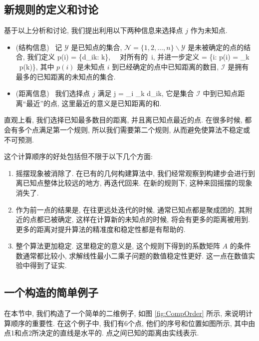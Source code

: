 \documentclass{CASthesis_zzk}
\begin{document}
\subsection{新规则的定义和讨论}
基于以上分析和讨论, 我们提出利用以下两种信息来选择点 $j$ 作为未知点.
\begin{itemize}
  \item (结构信息)%
  ~记 $\mathcal{Y}$ 是已知点的集合, $\mathcal{N} = \{1,2,\ldots,n\}\backslash \mathcal{Y}$ 是未被确定的点的结合, 我们定义
  \be p(i) = \sharp \{d_{ik}: k\in {}\}, ~~对所有的~i\in {}, \label{rule1} \ee
  并进一步定义
  \be {} = \{i: p(i) = \max_{k\in {}} ~p(k)\}, \label{rule2}\ee
  其中 $p(i)$ 是未知点 $i$ 到已经确定的点中已知距离的数目, $\mathcal{I}$ 是拥有最多的已知距离的未知点的集合.
  \item (距离信息)%
  ~我们选择点 $j$ 满足
  \be j = \arg\min_{i\in {}} \sum_{k\in {}} d_{ik}, \label{rule3}\ee
  它是集合 $\mathcal{I}$ 中到已知点距离``最近''的点, 这里最近的意义是已知距离的和.
\end{itemize}

直观上看, 我们选择已知最多数目的距离, 并且离已知点最近的点.
在很多时候, 都会有多个点满足第一个规则, 所以我们需要第二个规则,
从而避免使算法不稳定或不可预测.

这个计算顺序的好处包括但不限于以下几个方面:
\begin{enumerate}
  \item 摇摆现象被消除了. 在已有的几何构建算法中, 我们经常观察到构建步会进行到离已知点整体比较远的地方, 再迭代回来. 在新的规则下, 这种来回摇摆的现象消失了.
  \item 作为前一点的结果是, 在往更远处迭代的时候, 通常已知点都是聚成团的, 其附近的点都已被确定, 这样在计算新的未知点的时候, 将会有更多的距离被用到. 更多的距离对提升算法的精准度和稳定性都是有帮助的.
  \item 整个算法更加稳定. 这里稳定的意义是, 这个规则下得到的系数矩阵 $A$ 的条件数通常都比较小, 求解线性最小二乘子问题的数值稳定性更好. 这一点在数值实验中得到了证实.
\end{enumerate}

\subsection{一个构造的简单例子}
在本节中, 我们构造了一个简单的二维例子, 如图 \ref{fig:CompOrder} 所示,
来说明计算顺序的重要性.
在这个例子中, 我们有6个点, 他们的序号和位置如图所示,
其中由点1和点2所决定的直线是水平的.
点之间已知的距离由实线表示.
\end{document}
